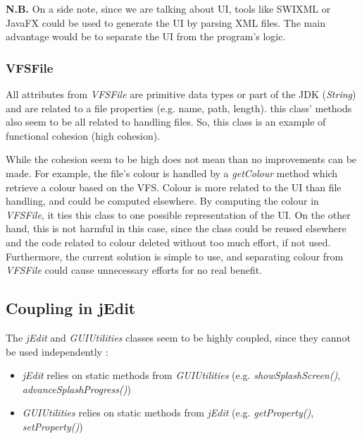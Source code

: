 \begin{framehint2}
    \textbf{N.B.} On a side note, since we are talking about UI, tools like
    SWIXML or JavaFX could be used to generate the UI by parsing XML files.
    The main advantage would be to separate the UI from the program's logic.
\end{framehint2}

\subsubsection{VFSFile}

All attributes from \emph{VFSFile} are primitive data types or part of
the JDK (\emph{String}) and are related to a file properties (e.g. name, path,
length). this class' methods also seem to be all related to handling files.
So, this class is an example of functional cohesion (high cohesion).

\begin{framewarning}
    While the cohesion seem to be high does not mean than no improvements can
    be made.
    For example, the file's colour is handled by a \emph{getColour} method which
    retrieve a colour based on the VFS. Colour is more related to the UI than
    file handling, and could be computed elsewhere.
    By computing the colour in \emph{VFSFile}, it ties this class to one
    possible representation of the UI. On the other hand, this is not harmful in
    this case, since the class could be reused elsewhere and the code related to
    colour deleted without too much effort, if not used. Furthermore, the
    current solution is simple to use, and separating colour from
    \emph{VFSFile} could cause unnecessary efforts for no real benefit.
\end{framewarning}

\subsection{Coupling in jEdit}

The \emph{jEdit} and \emph{GUIUtilities} classes seem to be highly
coupled, since they cannot be used independently :

\begin{itemize}\itemsep1pt
    \item \emph{jEdit} relies on static methods from \emph{GUIUtilities} (e.g.
    \emph{showSplashScreen()}, \emph{advanceSplashProgress()})

    \item \emph{GUIUtilities} relies on static methods from \emph{jEdit} (e.g.
    \emph{getProperty()}, \emph{setProperty()})
\end{itemize}

